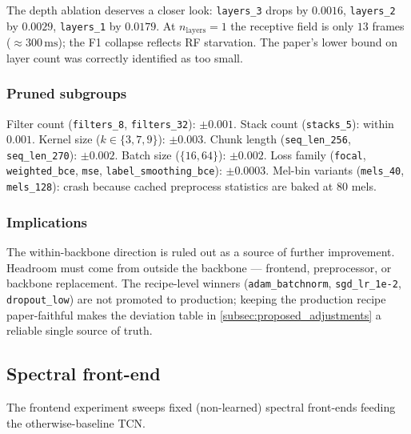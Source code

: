 The depth ablation deserves a closer look: \texttt{layers\_3} drops by $0.0016$, \texttt{layers\_2} by $0.0029$, \texttt{layers\_1} by $0.0179$.
At $n_{\text{layers}} = 1$ the receptive field is only $13$ frames ($\approx 300\,\text{ms}$); the F1 collapse reflects RF starvation.
The paper's lower bound on layer count was correctly identified as too small.

\subsubsection*{Pruned subgroups}

Filter count (\texttt{filters\_8}, \texttt{filters\_32}): $\pm 0.001$.
Stack count (\texttt{stacks\_5}): within $0.001$.
Kernel size ($k \in \{3, 7, 9\}$): $\pm 0.003$.
Chunk length (\texttt{seq\_len\_256}, \texttt{seq\_len\_270}): $\pm 0.002$.
Batch size ($\{16, 64\}$): $\pm 0.002$.
Loss family (\texttt{focal}, \texttt{weighted\_bce}, \texttt{mse}, \texttt{label\_smoothing\_bce}): $\pm 0.0003$.
Mel-bin variants (\texttt{mels\_40}, \texttt{mels\_128}): crash because cached preprocess statistics are baked at $80$ mels.

\subsubsection*{Implications}

The within-backbone direction is ruled out as a source of further improvement.
Headroom must come from outside the backbone — frontend, preprocessor, or backbone replacement.
The recipe-level winners (\texttt{adam\_batchnorm}, \texttt{sgd\_lr\_1e-2}, \texttt{dropout\_low}) are not promoted to production; keeping the production recipe paper-faithful makes the deviation table in \cref{subsec:proposed_adjustments} a reliable single source of truth.

\subsection{Spectral front-end}
\label{subsec:exp_frontend}
\label{sec:exp_frontend_results}

The frontend experiment sweeps fixed (non-learned) spectral front-ends feeding the otherwise-baseline TCN.

